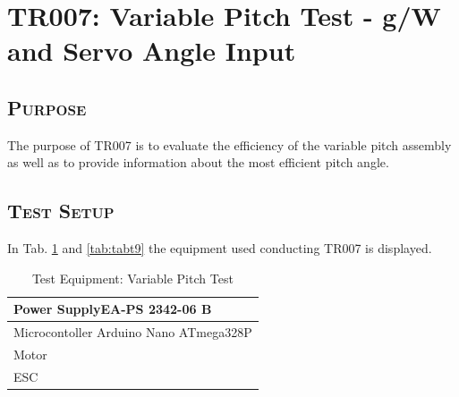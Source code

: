  
\newpage       
\section{TR007: Variable Pitch Test - g/W and Servo Angle Input}
         {}


\subsection*{\textsc{\medium Purpose}}
The purpose of TR007 is to evaluate the efficiency of the variable pitch assembly as well as to provide information about the most efficient pitch angle. 

\subsection*{\textsc{\medium Test Setup}}
In Tab. \ref{tab:tabt8} and \ref{tab:tabt9} the equipment used conducting TR007 is displayed. 
\begin {table}[H]
    \begin{center}
    \caption {Test Equipment: Variable Pitch Test } 
    \label{tab:tabt8} 
    \begin{tabular}{|l|}\hline 
        Power SupplyEA-PS 2342-06 B           \\ \hline
        Microcontoller Arduino Nano ATmega328P \\ \hline
        Motor \\ \hline
        ESC\\ \hline    
        \end{tabular}
    \end{center}
\end{table}

